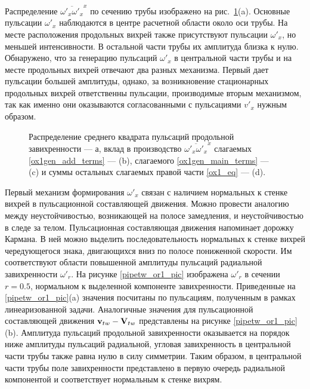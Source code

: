 Распределение $\overline{\omega'_x \omega'_x}^x$ по сечению трубы изображено на рис.~\ref{ox1gen_pic}(a). Основные пульсации $\omega'_x$ наблюдаются в центре расчетной области около оси трубы. На месте расположения продольных вихрей также присутствуют пульсации $\omega'_x$, но меньшей интенсивности. В остальной части трубы их амплитуда близка к нулю. Обнаружено, что за генерацию пульсаций $\omega'_x$ в центральной части трубы и на месте продольных вихрей отвечают два разных механизма. Первый дает пульсации большей амплитуды, однако, за возникновение стационарных продольных вихрей ответственны пульсации, производимые вторым механизмом, так как именно они оказываются согласованными с пульсациями $v'_x$ нужным образом.


\begin{figure}
\caption{Распределение среднего квадрата пульсаций продольной завихренности --- а, вклад в производство $\overline{\omega'_x \omega'_x }^x$ слагаемых \eqref{ox1gen_add_terms} --- (b), слагаемого \eqref{ox1gen_main_terms} --- (c) и суммы остальных слагаемых правой части \eqref{ox1_eq} --- (d).}
\label{ox1gen_pic}
\end{figure}


Первый механизм формирования $\omega'_x$ связан с наличием нормальных к стенке вихрей в пульсационной составляющей движения. Можно провести аналогию между неустойчивостью, возникающей на полосе замедления, и неустойчивостью в следе за телом. Пульсационная составляющая движения напоминает дорожку Кармана. В ней можно выделить последовательность нормальных к стенке вихрей чередующегося знака, двигающихся вниз по полосе пониженной скорости. Им соответствуют области повышенной амплитуды пульсаций радиальной завихренности $\omega'_r$. На рисунке \ref{pipetw_or1_pic} изображена $\omega'_r$ в сечении $r = 0.5$, нормальном к выделенной компоненте завихренности. Приведенные на \ref{pipetw_or1_pic}(a) значения посчитаны по пульсациям, полученным в рамках линеаризованной задачи. Аналогичные значения для пульсационной составляющей движения $\mathbf{v}_{tw} - \mathbf{V}_{tw}$ представлены на рисунке \ref{pipetw_or1_pic}(b). Амплитуда пульсаций продольной завихренности оказывается на порядок ниже амплитуды пульсаций радиальной, угловая завихренность в центральной части трубы также равна нулю в силу симметрии. Таким образом, в центральной части трубы поле завихренности представлено в первую очередь радиальной компонентой и соответствует нормальным к стенке вихрям.

